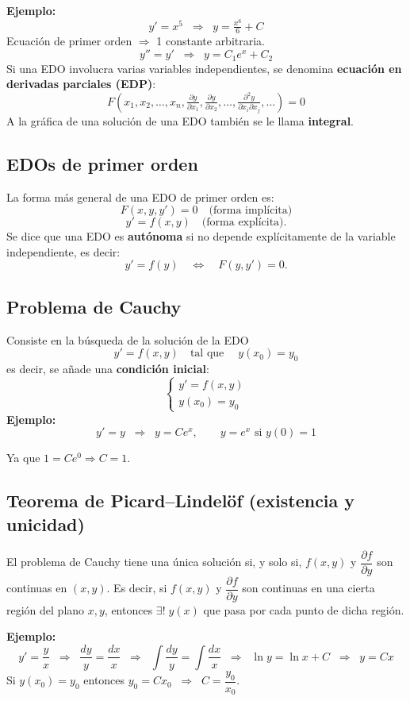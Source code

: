 \documentclass[a4paper,12pt]{article}
\begin{document}
\medskip
\noindent
\textbf{Ejemplo:}
\[
y' = x^5 \;\;\Rightarrow\;\; y = \tfrac{x^6}{6} + C
\]
Ecuación de primer orden $\Rightarrow$ 1 constante arbitraria.
\[
y'' = y' \;\;\Rightarrow\;\; y = C_1 e^x + C_2
\]
\noindent
Si una EDO involucra varias variables independientes, se denomina \textbf{ecuación en derivadas parciales (EDP)}:
\[
F(x_1,x_2,\ldots,x_n, \tfrac{\partial y}{\partial x_1}, \tfrac{\partial y}{\partial x_2}, \ldots, \tfrac{\partial^2 y}{\partial x_i \partial x_j}, \ldots ) = 0
\]
A la gráfica de una solución de una EDO también se le llama \textbf{integral}.  

\subsection*{EDOs de primer orden}
\noindent
La forma más general de una EDO de primer orden es:
\[
F(x,y,y')=0 \quad \text{(forma implícita)}
\]
\[
y' = f(x,y) \quad \text{(forma explícita)}.
\]
\noindent
Se dice que una EDO es \textbf{autónoma} si no depende explícitamente de la variable independiente, es decir:
\[
y' = f(y) \quad \Leftrightarrow \quad F(y,y')=0.
\]
\subsection{Problema de Cauchy}
\noindent
Consiste en la búsqueda de la solución de la EDO
\[ 
y' = f(x,y) \quad \text{tal que} \quad\; y(x_0) = y_0
\]
es decir, se añade una \textbf{condición inicial}:
\[
\begin{cases}
y' = f(x,y) \\
y(x_0) = y_0
\end{cases}
\]
\noindent
\textbf{Ejemplo:}
\[
y' = y \;\;\Rightarrow\;\; y = C e^x, \qquad y=e^x \text{ si } y(0)=1
\]

\medskip
\noindent
Ya que $1 = C e^0 \Rightarrow C=1$.

\subsection{Teorema de Picard–Lindelöf (existencia y unicidad)}
\noindent
El problema de Cauchy tiene una única solución si, y solo si, $f(x,y)$ y
$\dfrac{\partial f}{\partial y}$ son continuas en $(x,y)$.
\noindent
Es decir, si $f(x,y)$ y $\dfrac{\partial f}{\partial y}$ son continuas en una cierta región del plano $x,y$,  
entonces $\exists! \; y(x)$ que pasa por cada punto de dicha región.

\medskip
\noindent
\textbf{Ejemplo:}
\[
y' = \frac{y}{x} \;\;\Rightarrow\;\; \frac{dy}{y} = \frac{dx}{x}
\;\;\Rightarrow\;\; \int \frac{dy}{y} = \int \frac{dx}{x}
\;\;\Rightarrow\;\; \ln y = \ln x + C \;\;\Rightarrow\;\; y = Cx
\]
\noindent
Si $y(x_0)=y_0$ entonces $y_0 = Cx_0 \;\;\Rightarrow\;\; C = \dfrac{y_0}{x_0}$.
\end{document}
